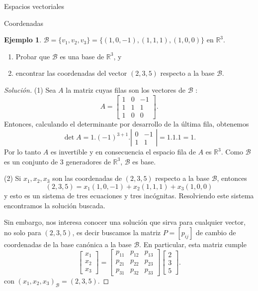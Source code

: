 \documentclass[a4paper,12pt,twoside,spanish,reqno]{amsbook}
\theoremstyle{definition}
\newtheorem{ejemplo}{Ejemplo}[section]
\theoremstyle{remark}
\newcommand{\R}{\mathbb R}
\begin{document}
\begin{chapter}{Espacios vectoriales}
\begin{section}{Coordenadas}
	
	\begin{ejemplo}
		 $\mathcal{B} = \{v_1,v_2,v_3 \}=\{(1,0,-1),(1,1,1),(1,0,0) \}$ en $\R^3$.
		\begin{enumerate}
			\item Probar que $\mathcal{B}$ es una base de $\R^3$, y 
			\item encontrar las coordenadas del vector  $(2,3,5)$ respecto a la base  $\mathcal{B}$. 
		\end{enumerate}
	\end{ejemplo}
\begin{proof}[Solución]
	(1) Sea $A$ la matriz cuyas filas son los vectores de $\mathcal{B}$ :
	$$
	A = \begin{bmatrix} 1&0&-1\\1&1&1\\1&0&0	\end{bmatrix}.
	$$
	Entonces,  calculando el determinante  por desarrollo de la última fila, obtenemos
	$$
	\det A = 1.(-1)^{3+1}. 
	\left| \begin{matrix} 0&-1\\1&1	\end{matrix} \right| = 1.1.1 =1.
	$$ 
	Por  lo tanto $A$ es invertible y en consecuencia el espacio fila de $A$ es $\R^3$. Como $\mathcal{B}$ es un conjunto de 3  generadores de  $\R^3$, $\mathcal{B}$ es base.
	
	(2) Si $x_1,x_2,x_3$  son las coordenadas de $(2,3,5)$ respecto a la base  $\mathcal{B}$, entonces
	$$
	(2,3,5) = x_1(1,0,-1)+x_2(1,1,1)+x_3(1,0,0)
	$$
	y esto es un sistema de tres ecuaciones y tres incógnitas.  Resolviendo este sistema encontramos la solución buscada. 
	
	Sin embargo,  nos interesa conocer una solución que sirva para cualquier vector, no solo para $(2,3,5)$, es decir buscamos la matriz $P = [p_{ij}]$ de cambio de coordenadas de la base canónica a la base $\mathcal B$. En particular,  esta matriz cumple 
	$$
	\begin{bmatrix} x_1\\x_2\\x_3 \end{bmatrix} = 
	\begin{bmatrix}p_{11} &p_{12}& p_{13} \\p_{21} &p_{22} & p_{23}\\ p_{31} &p_{32}& p_{33}\end{bmatrix}
	\begin{bmatrix} 2\\3\\5 \end{bmatrix}.
	$$
	con $(x_1,x_2,x_3)_{\mathcal B} = (2,3,5)$.
	

\end{proof}
\end{section}
\end{chapter}
\end{document}
